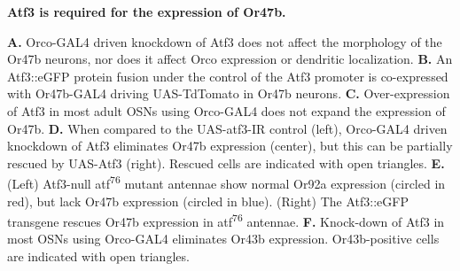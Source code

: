 {\bf Atf3 is required for the expression of Or47b.}

\textbf{A.} Orco-GAL4 driven knockdown of Atf3 does not affect the morphology of the Or47b neurons, nor does it affect Orco expression or dendritic localization.
\textbf{B.} An Atf3::eGFP protein fusion under the control of the Atf3 promoter is co-expressed with Or47b-GAL4 driving UAS-TdTomato in Or47b neurons.
\textbf{C.} Over-expression of Atf3 in most adult OSNs using Orco-GAL4 does not expand the expression of Or47b.
\textbf{D.} When compared to the UAS-atf3-IR control (left), Orco-GAL4 driven knockdown of Atf3 eliminates Or47b expression (center), but this can be partially rescued by UAS-Atf3 (right). Rescued cells are indicated with open triangles.
\textbf{E.} (Left) Atf3-null atf\textsuperscript{76} mutant antennae show normal Or92a expression (circled in red), but lack Or47b expression (circled in blue). (Right) The Atf3::eGFP transgene rescues Or47b expression in atf\textsuperscript{76} antennae.
\textbf{F.} Knock-down of Atf3 in most OSNs using Orco-GAL4 eliminates Or43b expression. Or43b-positive cells are indicated with open triangles.
\label{fig:3}
